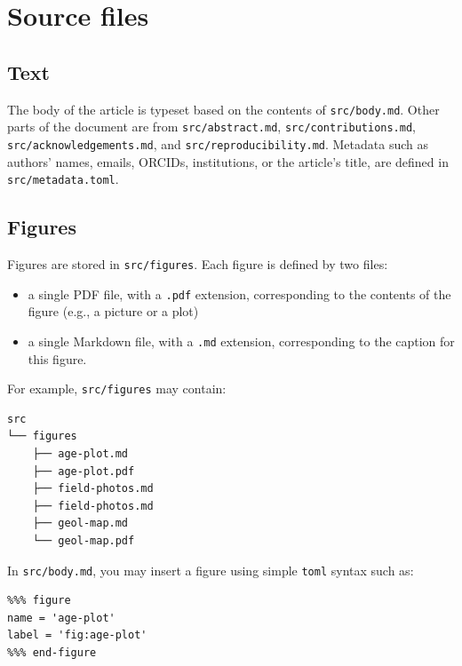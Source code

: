 \newcommand{\foo}{FOO}
\newcommand{\baz}{BAZ}
\newcommand{\degC}[1]{\,°C}

\hypertarget{source-files}{%
\section{Source files}\label{source-files}}

\hypertarget{text}{%
\subsection{Text}\label{text}}

The body of the article is typeset based on the contents of
\texttt{src/body.md}. Other parts of the document are from
\texttt{src/abstract.md}, \texttt{src/contributions.md},
\texttt{src/acknowledgements.md}, and \texttt{src/reproducibility.md}.
Metadata such as authors' names, emails, ORCIDs, institutions, or the
article's title, are defined in \texttt{src/metadata.toml}.

\hypertarget{figures}{%
\subsection{Figures}\label{figures}}

Figures are stored in \texttt{src/figures}. Each figure is defined by
two files:

\begin{itemize}
\tightlist
\item
  a single PDF file, with a \texttt{.pdf} extension, corresponding to
  the contents of the figure (e.g., a picture or a plot)
\item
  a single Markdown file, with a \texttt{.md} extension, corresponding
  to the caption for this figure.
\end{itemize}

For example, \texttt{src/figures} may contain:

\begin{verbatim}
src
└── figures
    ├── age-plot.md
    ├── age-plot.pdf
    ├── field-photos.md
    ├── field-photos.md
    ├── geol-map.md
    └── geol-map.pdf
\end{verbatim}

In \texttt{src/body.md}, you may insert a figure using simple
\texttt{toml} syntax such as:

\begin{verbatim}
%%% figure
name = 'age-plot'
label = 'fig:age-plot'
%%% end-figure
\end{verbatim}

